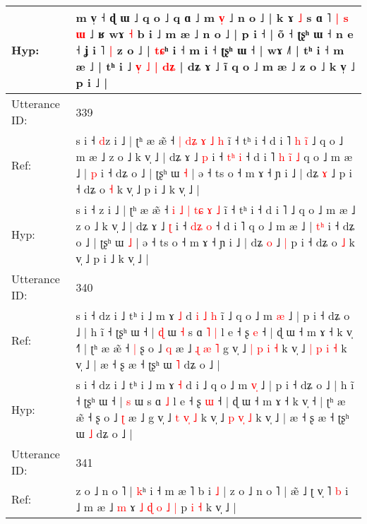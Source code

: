 \documentclass[10pt]{article}
\DeclareRobustCommand{\hl}[1]{{\textcolor{red}{#1}}}
\begin{document}
\begin{longtable}{ll}
 \\
Hyp: & m v̩ ˧ ɖ ɯ ˩ q o ˩ q ɑ ˩ m \hl{v}\hl{̩} ˩ n o ˩ | k ɤ \hl{˩} s ɑ ˥\hl{ }\hl{|} \hl{s} \hl{ɯ} ˩ ʁ wɤ \hl{˧} b i ˩ m æ ˩ n o ˩ | p i ˧ | õ ˧ ʈʂʰ ɯ ˧ n e ˧ ʝ i ˥\hl{ }\hl{|} z o ˩ | \hl{t}\hl{ɕ}ʰ i ˧ m i ˧ ʈʂʰ ɯ ˧ | wɤ ˩˥ | tʰ i ˧ m æ ˩ | tʰ i ˩\hl{ }\hl{v}\hl{̩} \hl{˩}\hl{ }\hl{|} \hl{d}\hl{ʑ} | dʑ ɤ ˩\hl{}\hl{} ĩ\hl{}\hl{} q o ˩ m æ ˩ z o ˩ k v̩ ˩ p i ˩ |
 \\
\midrule
Utterance ID: & 339 \\
Ref: & s i ˧ \hl{d}z i ˩ | ʈʰ æ æ̃ ˧ \hl{|} \hl{}\hl{d}\hl{ʑ} \hl{}\hl{ɤ} \hl{˩} \hl{h} ĩ ˧ tʰ i ˧ d i ˥\hl{ }\hl{h}\hl{ }\hl{i}\hl{̃} ˩ q o ˩ m æ ˩ z o ˩ k v̩ ˩ | dʑ ɤ ˩ \hl{p} i ˧ \hl{t}\hl{ʰ} \hl{i} ˧ d i ˥\hl{ }\hl{h}\hl{ }\hl{i}\hl{̃}\hl{ }\hl{˩} q o ˩ m æ ˩ | \hl{}\hl{p} i ˧ dʑ o ˩ | ʈʂʰ ɯ \hl{˧} | ə ˧ ts o ˧ m ɤ ˧ ɲ i ˩ | dʑ \hl{ɤ} ˩\hl{}\hl{} p i ˧ dʑ o \hl{˧} k v̩ ˩ p i ˩ k v̩ ˩ |
 \\
Hyp: & s i ˧ \hl{}z i ˩ | ʈʰ æ æ̃ ˧ \hl{i} \hl{˩}\hl{ }\hl{|} \hl{t}\hl{ɕ} \hl{ɤ} \hl{˩} ĩ ˧ tʰ i ˧ d i ˥\hl{}\hl{}\hl{}\hl{}\hl{} ˩ q o ˩ m æ ˩ z o ˩ k v̩ ˩ | dʑ ɤ ˩ \hl{ʈ} i ˧ \hl{d}\hl{ʑ} \hl{o} ˧ d i ˥\hl{}\hl{}\hl{}\hl{}\hl{}\hl{}\hl{} q o ˩ m æ ˩ | \hl{t}\hl{ʰ} i ˧ dʑ o ˩ | ʈʂʰ ɯ \hl{˩} | ə ˧ ts o ˧ m ɤ ˧ ɲ i ˩ | dʑ \hl{o} ˩\hl{ }\hl{|} p i ˧ dʑ o \hl{˩} k v̩ ˩ p i ˩ k v̩ ˩ |
 \\
\midrule
Utterance ID: & 340 \\
Ref: & s i ˧ dz i ˩ tʰ i ˩ m ɤ \hl{˩} d\hl{ }\hl{i}\hl{ }\hl{˩}\hl{ }\hl{h} i\hl{̃} ˩ q o ˩ m \hl{}\hl{æ} ˩ | p i ˧ dʑ o ˩ | h ĩ ˧ ʈʂʰ ɯ ˧ | \hl{ɖ} ɯ\hl{ }\hl{˧} s ɑ\hl{ }\hl{˥} \hl{|} l e ˧ ʂ \hl{e} ˧ | ɖ ɯ ˧ m ɤ ˧ k v̩ ˧\hl{˥} | ʈʰ æ æ̃ ˧\hl{ }\hl{|} ʂ o ˩ \hl{q} æ ˩\hl{ }\hl{ɻ}\hl{ }\hl{æ}\hl{ }\hl{˥} g v̩ ˩ \hl{|} \hl{p}\hl{ }\hl{i} \hl{˧} k v̩ ˩ \hl{|} \hl{p}\hl{ }\hl{i} \hl{˧} k v̩ ˩ | æ ˧ ʂ æ ˧ ʈʂʰ ɯ \hl{˥} dʑ o ˩ |
 \\
Hyp: & s i ˧ dz i ˩ tʰ i ˩ m ɤ \hl{˧} d\hl{}\hl{}\hl{}\hl{}\hl{}\hl{} i\hl{} ˩ q o ˩ m \hl{v}\hl{̩} ˩ | p i ˧ dʑ o ˩ | h ĩ ˧ ʈʂʰ ɯ ˧ | \hl{s} ɯ\hl{}\hl{} s ɑ\hl{}\hl{} \hl{˩} l e ˧ ʂ \hl{ɯ} ˧ | ɖ ɯ ˧ m ɤ ˧ k v̩ ˧\hl{} | ʈʰ æ æ̃ ˧\hl{}\hl{} ʂ o ˩ \hl{ʈ} æ ˩\hl{}\hl{}\hl{}\hl{}\hl{}\hl{} g v̩ ˩ \hl{t} \hl{}\hl{v}\hl{̩} \hl{˩} k v̩ ˩ \hl{p} \hl{}\hl{v}\hl{̩} \hl{˩} k v̩ ˩ | æ ˧ ʂ æ ˧ ʈʂʰ ɯ \hl{˩} dʑ o ˩ |
 \\
\midrule
Utterance ID: & 341 \\
Ref: & z o ˩ n o ˥ | \hl{}\hl{k}ʰ i ˧ m æ ˥ b i \hl{˩} | z o ˩ n o ˥ | æ\hl{̃} ˩ ʈ v̩ ˥ \hl{b} i ˩ m æ ˩\hl{ }\hl{m} ɤ\hl{ }\hl{˩} \hl{ɖ} \hl{o} \hl{˩} \hl{|} p \hl{i} \hl{˧} k v̩ ˩ |

\end{longtable}
\end{document}
